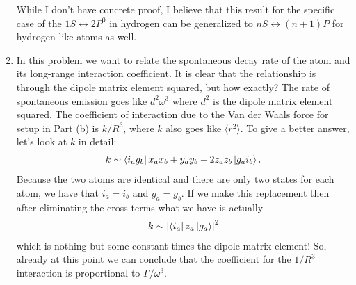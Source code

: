 \documentclass{article}
\theoremstyle{definition}
\begin{document}
\begin{enumerate}[label=(\alph*)]
While I don't have concrete proof, I believe that this result for the specific case of the $1S \leftrightarrow 2P^0$ in hydrogen can be generalized to $nS \leftrightarrow (n+1)P$ for hydrogen-like atoms as well.




\item In this problem we want to relate the spontaneous decay rate of the atom and its long-range interaction coefficient. It is clear that the relationship is through the dipole matrix element squared, but how exactly? The rate of spontaneous emission goes like $d^2 \omega^3$ where $d^2$ is the dipole matrix element squared. The coefficient of interaction due to the Van der Waals force for setup in Part (b) is $k / R^3$, where $k$ also goes like $\langle r^2 \rangle$. To give a better answer, let's look at $k$ in detail:
\begin{align*}
k \sim \bra{i_a g_b}   x_a x_b + y_a y_b - 2z_a z_b \ket{g_a i_b}.
\end{align*}
Because the two atoms are identical and there are only two states for each atom, we have that $i_a = i_b$ and $g_a = g_b$. If we make this replacement then after eliminating the cross terms what we have is actually 
\begin{align*}
k \sim \abs{ \bra{i_a}  z_a \ket{g_a } }^2
\end{align*}
which is nothing but some constant times the dipole matrix element! So, already at this point we can conclude that the coefficient for the $1/R^3$ interaction is proportional to $\Gamma / \omega^3$. \\


\end{enumerate}
\end{document}
